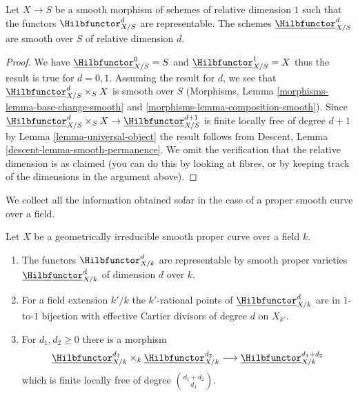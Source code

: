 \begin{lemma}
\label{lemma-hilb-d-smooth}
Let $X \to S$ be a smooth morphism of schemes of relative dimension $1$
such that the functors $\Hilbfunctor^d_{X/S}$ are representable. The
schemes $\underline{\Hilbfunctor}^d_{X/S}$ are smooth over $S$ of
relative dimension $d$.
\end{lemma}

\begin{proof}
We have $\underline{\Hilbfunctor}^0_{X/S} = S$ and
$\underline{\Hilbfunctor}^1_{X/S} = X$ thus the result is true for $d = 0, 1$.
Assuming the result for $d$, we see that
$\underline{\Hilbfunctor}^d_{X/S} \times_S X$ is smooth over $S$
(Morphisms, Lemma \ref{morphisms-lemma-base-change-smooth} and
\ref{morphisms-lemma-composition-smooth}). Since
$\underline{\Hilbfunctor}^d_{X/S} \times_S X \to
\underline{\Hilbfunctor}^{d + 1}_{X/S}$
is finite locally free of degree $d + 1$ by
Lemma \ref{lemma-universal-object}
the result follows from
Descent, Lemma \ref{descent-lemma-smooth-permanence}.
We omit the verification that the relative dimension is
as claimed (you can do this by looking at fibres, or by
keeping track of the dimensions in the argument above).
\end{proof}

\noindent
We collect all the information obtained sofar in the case of
a proper smooth curve over a field.

\begin{proposition}
\label{proposition-hilb-d}
Let $X$ be a geometrically irreducible smooth proper curve over a field $k$.
\begin{enumerate}
\item The functors $\Hilbfunctor^d_{X/k}$ are representable by smooth
proper varieties $\underline{\Hilbfunctor}^d_{X/k}$ of dimension
$d$ over $k$.
\item For a field extension $k'/k$ the $k'$-rational points
of $\underline{\Hilbfunctor}^d_{X/k}$ are in $1$-to-$1$ bijection
with effective Cartier divisors of degree $d$ on $X_{k'}$.
\item For $d_1, d_2 \geq 0$ there is a morphism
$$
\underline{\Hilbfunctor}^{d_1}_{X/k}
\times_k
\underline{\Hilbfunctor}^{d_2}_{X/k}
\longrightarrow
\underline{\Hilbfunctor}^{d_1 + d_2}_{X/k}
$$
which is finite locally free of degree ${d_1 + d_2 \choose d_1}$.
\end{enumerate}
\end{proposition}

